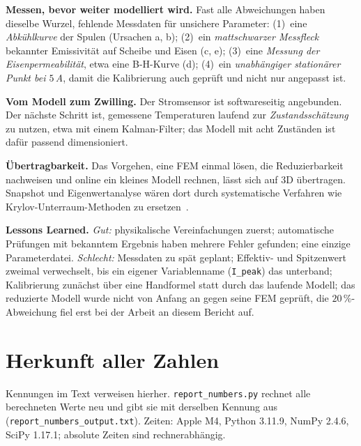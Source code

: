 \documentclass[a4paper, 10pt, conference]{ieeeconf}
\theoremstyle{remark}
\begin{document}
\textbf{Messen, bevor weiter modelliert wird.} Fast alle Abweichungen haben
dieselbe Wurzel, fehlende Messdaten für unsichere Parameter:
(1)~eine \emph{Abkühlkurve} der Spulen (Ursachen a, b);
(2)~ein \emph{mattschwarzer Messfleck} bekannter Emissivität auf Scheibe
und Eisen (c, e);
(3)~eine \emph{Messung der Eisenpermeabilität}, etwa eine B-H-Kurve (d);
(4)~ein \emph{unabhängiger stationärer Punkt bei $5\,$A}, damit die
Kalibrierung auch geprüft und nicht nur angepasst ist.

\textbf{Vom Modell zum Zwilling.} Der Stromsensor ist softwareseitig
angebunden. Der nächste Schritt ist, gemessene Temperaturen laufend zur
\emph{Zustandsschätzung} zu nutzen, etwa mit einem Kalman-Filter; das
Modell mit acht Zuständen ist dafür passend dimensioniert.

\textbf{Übertragbarkeit.} Das Vorgehen, eine FEM einmal lösen, die
Reduzierbarkeit nachweisen und online ein kleines Modell rechnen, lässt sich
auf 3D übertragen. Snapshot und Eigenwertanalyse wären dort durch
systematische Verfahren wie Krylov-Unterraum-Methoden zu
ersetzen~\cite{hartmann2025golden,hartmann2018mor}.

\textbf{Lessons Learned.} \emph{Gut:} physikalische Vereinfachungen zuerst;
automatische Prüfungen mit bekanntem Ergebnis haben mehrere Fehler
gefunden; eine einzige Parameterdatei. \emph{Schlecht:} Messdaten zu spät
geplant; Effektiv- und Spitzenwert zweimal verwechselt, bis ein eigener
Variablenname (\texttt{I\_peak}) das unterband; Kalibrierung zunächst über
eine Handformel statt durch das laufende Modell; das reduzierte Modell
wurde nicht von Anfang an gegen seine FEM geprüft, die
$20\,\%$-Abweichung fiel erst bei der Arbeit an diesem Bericht auf.

\appendix

\section{Herkunft aller Zahlen}
\label{app:numbers}

Kennungen im Text verweisen hierher. \texttt{report\_numbers.py} rechnet
alle berechneten Werte neu und gibt sie mit derselben Kennung aus
(\texttt{report\_numbers\_output.txt}). Zeiten: Apple M4, Python 3.11.9,
NumPy 2.4.6, SciPy 1.17.1; absolute Zeiten sind rechnerabhängig.
\end{document}
